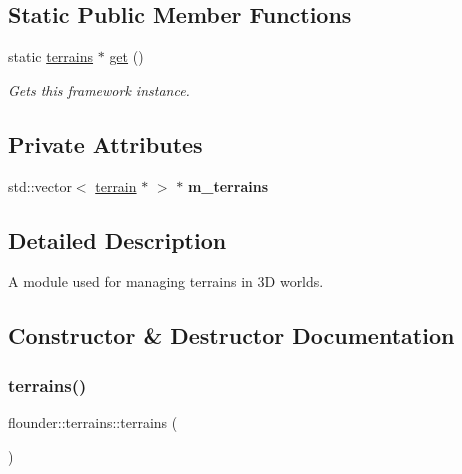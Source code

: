 \subsection*{Static Public Member Functions}
\begin{DoxyCompactItemize}
\item 
static \hyperlink{classflounder_1_1terrains}{terrains} $\ast$ \hyperlink{classflounder_1_1terrains_a4570cf86a66188282e88e8e76bacdf25}{get} ()
\begin{DoxyCompactList}\small\item\em Gets this framework instance. \end{DoxyCompactList}\end{DoxyCompactItemize}
\subsection*{Private Attributes}
\begin{DoxyCompactItemize}
\item 
\mbox{\label{classflounder_1_1terrains_ad46cea5eca716cf251f44bb88b6b2dec}} 
std\+::vector$<$ \hyperlink{classflounder_1_1terrain}{terrain} $\ast$ $>$ $\ast$ {\bfseries m\+\_\+terrains}
\end{DoxyCompactItemize}


\subsection{Detailed Description}
A module used for managing terrains in 3D worlds. 



\subsection{Constructor \& Destructor Documentation}
\mbox{\label{classflounder_1_1terrains_a9c58f36cb43aa3e10e8135e0ea6a0f6a}} 
\subsubsection{\texorpdfstring{terrains()}{terrains()}}
{\footnotesize\ttfamily flounder\+::terrains\+::terrains (\begin{DoxyParamCaption}{ }\end{DoxyParamCaption})}



